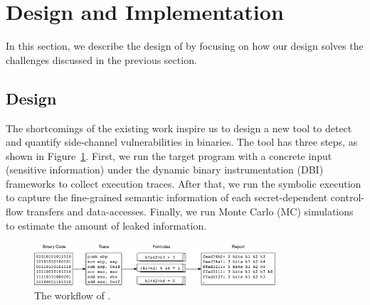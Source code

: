 \section{Design and Implementation}
In this section, we describe the design of \tool{} by focusing on how our design
solves the challenges discussed in the previous section.

\subsection{Design}
The shortcomings of the existing work inspire us to design a new tool to detect
and quantify side-channel vulnerabilities in binaries. The tool has three steps,
as shown in Figure~\ref{fig:workflow}. First, we run the target program with a
concrete input (sensitive information) under the dynamic binary instrumentation
(DBI) frameworks to collect execution traces. After that, we run the symbolic
execution to capture the fine-grained semantic information of each
secret-dependent control-flow transfers and data-accesses. Finally, we run Monte
Carlo (MC) simulations to estimate the amount of leaked information.

\begin{figure}[t]
    \centering
    \includegraphics[width=0.8\textwidth]{./figures/workflow.pdf}
    \caption{The workflow of \tool{}.}
    \label{fig:workflow}
\end{figure}

